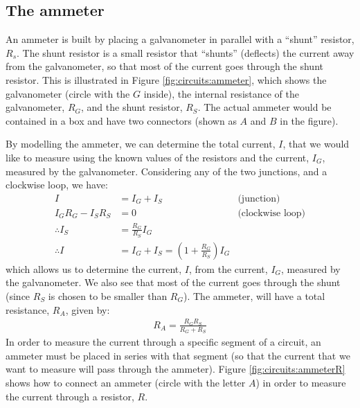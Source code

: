 \subsection{The ammeter}
An ammeter is built by placing a galvanometer in parallel with a ``shunt'' resistor, $R_s$. The shunt resistor is a small resistor that ``shunts'' (deflects) the current away from the galvanometer, so that most of the current goes through the shunt resistor. This is illustrated in Figure \ref{fig:circuits:ammeter}, which shows the galvanometer (circle with the $G$ inside), the internal resistance of the galvanometer, $R_G$, and the shunt resistor, $R_S$. The actual ammeter would be contained in a box and have two connectors (shown as $A$ and $B$ in the figure). 


By modelling the ammeter, we can determine the total current, $I$, that we would like to measure using the known values of the resistors and the current, $I_G$, measured by the galvanometer. Considering any of the two junctions, and a clockwise loop, we have:
\begin{align*}
I&=I_G+I_S \quad&\text{(junction)}\\
I_GR_G-I_SR_S&=0\quad&\text{(clockwise loop)}\\
\therefore I_S&=\frac{R_G}{R_S}I_G\\
\therefore I &= I_G+I_S=\left(1+\frac{R_G}{R_S}\right) I_G
\end{align*}  
which allows us to determine the current, $I$, from the current, $I_G$, measured by the galvanometer. We also see that most of the current goes through the shunt (since $R_S$ is chosen to be smaller than $R_G$). The ammeter, will have a total resistance, $R_A$, given by:
\begin{align*}
R_A=\frac{R_GR_S}{R_G+R_S}
\end{align*}
In order to measure the current through a specific segment of a circuit, an ammeter must be placed in series with that segment (so that the current that we want to measure will pass through the ammeter). Figure \ref{fig:circuits:ammeterR} shows how to connect an ammeter (circle with the letter $A$) in order to measure the current through a resistor, $R$.


